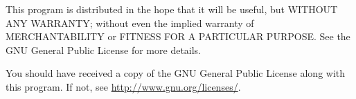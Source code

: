 \documentclass[14pt,twoside]{extarticle}
\newif\iftsukudraft\tsukudraftfalse
\begin{document}
This program is distributed in the hope that it will be useful,
but WITHOUT ANY WARRANTY; without even the implied warranty of
MERCHANTABILITY or FITNESS FOR A PARTICULAR PURPOSE.  See the
GNU General Public License for more details.

You should have received a copy of the GNU General Public License
along with this program.  If not, see \url{http://www.gnu.org/licenses/}.

\clearpage


\tableofcontents


\clearpage

\setlength{\parskip}{0pt}
\small\kaku

\newcommand{\LabelFont}{\anbirutekimono\tiny}

\newcommand{\LineNumber}[1]{\makebox[0pt][r]{\scriptsize #1~}}

\newcommand{\CopyrightNotice}[2]%
  {\LineNumber{#1--#2}\hyperlink{cpynotice}{[Standard copyright notice]}\par}

\newcommand{\FileGroup}[2]%
  {\cleardoublepage\part{#1}\cleardoublepage\def\partarab{#2}}
\newcommand{\File}[1]%
  {\clearpage\section*{#1}\phantomsection\addcontentsline{toc}{section}{#1}}
\newcommand{\Subhead}[2]%
  {\subsection*{#1}\phantomsection\addcontentsline{toc}{subsection}{#1}}


\newcommand{\Picture}[9]{
\hfill
\begin{tikzpicture}[scale=1.3,>=latex']
  \useasboundingbox (#6) rectangle (#7);
  \iftsukudraft
    \draw (#6) rectangle (#7);
    \node at ($(#6)!0.5!(#7)$) {DRAFT};
  \else
    \draw[color=black!50!white,xslant=#8] (#4,-1) grid (#5,9);
    \draw[color=black!50!white,ultra thick,->,xslant=#8] (#4,0) -- (#5,0);
    \draw[color=black!50!white,ultra thick,->,xslant=#8] (0,-1) -- (0,9);
    \fill[color=white] (0,0) circle(0.1);
    \draw[color=black!50!white] (0,0) circle(0.1);
    \draw[inner sep=0pt,anchor=base west,color=blue!30!white]
      (0,0) node{\scalebox{30.823}{\normalsize\KDF #3}};
    \draw[inner sep=0pt,anchor=base west,color=green!70!black,opacity=0.4]
      (0,0) node{\scalebox{30.823}{\normalsize\MDF #3}};
    #9
  \fi
\end{tikzpicture}%
\hspace*{\fill}\par
}
\end{document}
